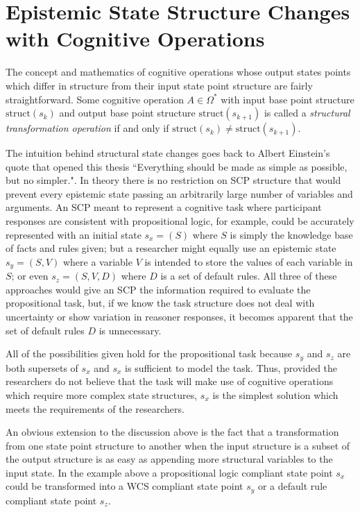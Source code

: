 {\section{Epistemic State Structure Changes with Cognitive Operations}
The concept and mathematics of cognitive operations whose output states points which differ in structure from their input state point structure are fairly straightforward. Some cognitive operation $A \in \Omega^*$ with input base point structure $\textrm{struct}(s_k)$ and output base point structure $\textrm{struct}(s_{k+1})$ is called a \textit{structural transformation operation} if and only if $\textrm{struct}(s_k) \ne \textrm{struct}(s_{k+1})$.

The intuition behind structural state changes goes back to Albert Einstein's quote that opened this thesis ``Everything should be made as simple as possible, but no simpler.". In theory there is no restriction on SCP structure that would prevent every epistemic state passing an arbitrarily large number of variables and arguments. An SCP meant to represent a cognitive task where participant responses are consistent with propositional logic, for example, could be accurately represented with an initial state $s_x=(S)$ where $S$ is simply the knowledge base of facts and rules given; but a researcher might equally use an epistemic state $s_y=(S,V)$ where a variable $V$ is intended to store the values of each variable in $S$; or even $s_z=(S,V,D)$ where $D$ is a set of default rules. All three of these approaches would give an SCP the information required to evaluate the propositional task, but, if we know the task structure does not deal with uncertainty or show variation in reasoner responses, it becomes apparent that the set of default rules $D$ is unnecessary.

All of the possibilities given hold for the propositional task because $s_y$ and $s_z$ are both supersets of $s_x$ and $s_x$ is sufficient to model the task. Thus, provided the researchers do not believe that the task will make use of cognitive operations which require more complex state structures, $s_x$ is the simplest solution which meets the requirements of the researchers.

An obvious extension to the discussion above is the fact that a transformation from one state point structure to another when the input structure is a subset of the output structure is as easy as appending more structural variables to the input state. In the example above a propositional logic compliant state point $s_x$ could be transformed into a WCS compliant state point $s_y$ or a default rule compliant state point $s_z$.

}
